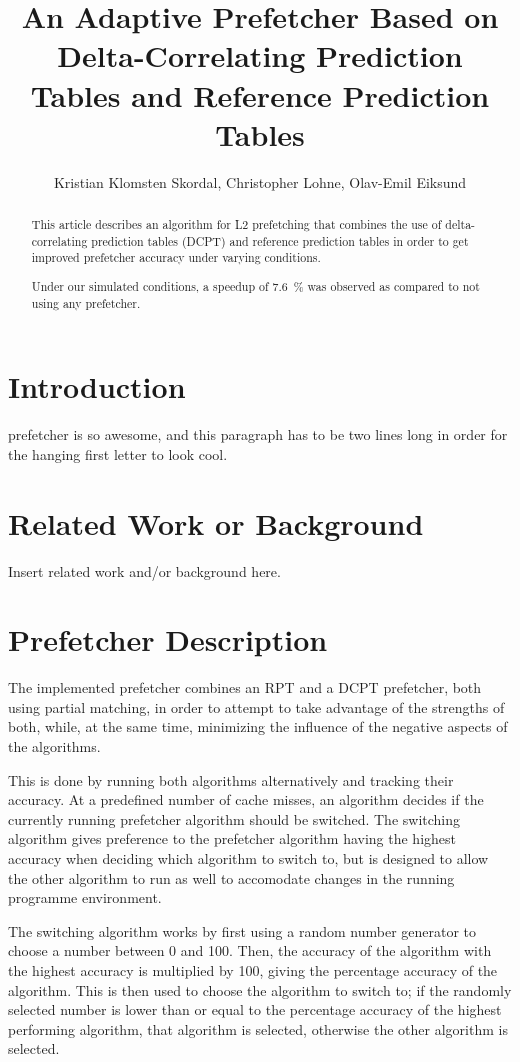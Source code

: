 \documentclass[journal,a4paper]{IEEEtran}
\begin{document}
\title{An Adaptive Prefetcher Based on Delta-Correlating Prediction Tables and Reference Prediction Tables}
\author{Kristian Klomsten Skordal, Christopher Lohne, Olav-Emil Eiksund}
\maketitle

\begin{abstract}
This article describes an algorithm for L2 prefetching that combines the use of
delta-correlating prediction tables (DCPT) and reference prediction tables in
order to get improved prefetcher accuracy under varying conditions.

Under our simulated conditions, a speedup of 7.6~\% was observed as compared to
not using any prefetcher.
\end{abstract}

\section{Introduction}
 prefetcher is so awesome, and this paragraph has to be two
lines long in order for the hanging first letter to look cool.

\section{Related Work or Background}
Insert related work and/or background here.

\section{Prefetcher Description}
The implemented prefetcher combines an RPT and a DCPT prefetcher, both using
partial matching, in order to attempt to take advantage of the strengths of
both, while, at the same time, minimizing the influence of the negative
aspects of the algorithms.

This is done by running both algorithms alternatively and tracking their
accuracy. At a predefined number of cache misses, an algorithm decides if the
currently running prefetcher algorithm should be switched. The switching
algorithm gives preference to the prefetcher algorithm having the highest
accuracy when deciding which algorithm to switch to, but is designed to allow
the other algorithm to run as well to accomodate changes in the running
programme environment.

The switching algorithm works by first using a random number generator to
choose a number between 0 and 100. Then, the accuracy of the algorithm with the
highest accuracy is multiplied by 100, giving the percentage accuracy of the
algorithm. This is then used to choose the algorithm to switch to; if the randomly
selected number is lower than or equal to the percentage accuracy of the highest
performing algorithm, that algorithm is selected, otherwise the other algorithm
is selected.
\end{document}
